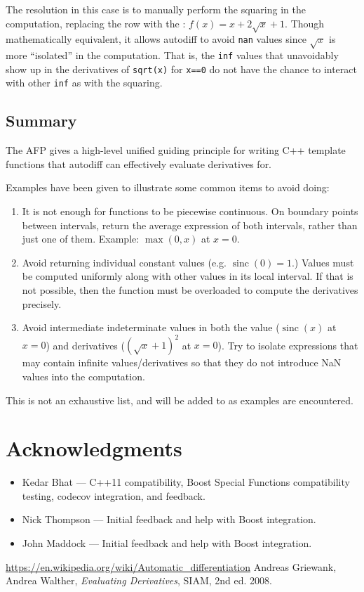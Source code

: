 \documentclass{article}
\DeclareMathOperator{\sinc}{sinc}
\begin{document}
The resolution in this case is to manually perform the squaring in the computation, replacing the  row
with the : $f(x)=x+2\sqrt{x}+1$. Though mathematically equivalent, it allows autodiff to avoid {\tt nan}
values since $\sqrt x$ is more ``isolated'' in the computation. That is, the {\tt inf} values that unavoidably
show up in the derivatives of {\tt sqrt(x)} for {\tt x==0} do not have the chance to interact with other {\tt inf}
as with the squaring.

\subsection{Summary}

The AFP gives a high-level unified guiding principle for writing C++ template functions that autodiff can
effectively evaluate derivatives for.

Examples have been given to illustrate some common items to avoid doing:

\begin{enumerate}
\item It is not enough for functions to be piecewise continuous. On boundary points between intervals, return the
    average expression of both intervals, rather than just one of them. Example: $\max(0,x)$ at $x=0$.
\item Avoid returning individual constant values (e.g. $\sinc(0)=1$.) Values must be computed uniformly along
    with other values in its local interval. If that is not possible, then the function must be overloaded to
    compute the derivatives precisely.
\item Avoid intermediate indeterminate values in both the value ($\sinc(x)$ at $x=0$) and derivatives
    ($(\sqrt{x}+1)^2$ at $x=0$). Try to isolate expressions that may contain infinite values/derivatives so
    that they do not introduce NaN values into the computation.
\end{enumerate}
This is not an exhaustive list, and will be added to as examples are encountered.

\section{Acknowledgments}

\begin{itemize}
\item Kedar Bhat --- C++11 compatibility, Boost Special Functions compatibility testing, codecov integration,
    and feedback.
\item Nick Thompson --- Initial feedback and help with Boost integration.
\item John Maddock --- Initial feedback and help with Boost integration.
\end{itemize}

\begin{thebibliography}{1}
 \url{https://en.wikipedia.org/wiki/Automatic\_differentiation}
 Andreas Griewank, Andrea Walther, \textit{Evaluating Derivatives}, SIAM, 2nd ed. 2008.
\end{thebibliography}
\end{document}
